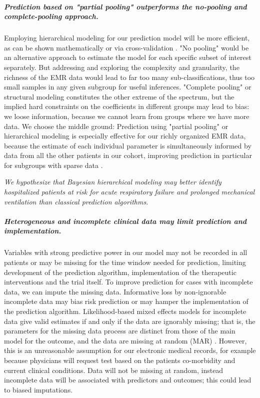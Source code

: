 \documentclass[11pt,notitlepage]{article}
\begin{document}
\subparagraph*{Prediction based on "partial pooling" outperforms the no-pooling and complete-pooling approach.}
Employing hierarchical modeling for our prediction model will be more efficient, as can be shown mathematically or via cross-validation \cite{Gelman-Hill_2014}. "No pooling" would be an alternative approach to estimate the model for each specific subset of interest separately. But addressing and exploring the complexity and granularity, the richness of the EMR data would lead to far too many sub-classifications, thus too small samples in any given subgroup for useful inferences. "Complete pooling" or structural modeling constitutes the other extreme of the spectrum, but the implied hard constraints on the coefficients in different groups may lead to bias: we loose information, because we cannot learn from groups where we have more data. We choose the middle ground: Prediction using "partial pooling" or hierarchical modeling is especially effective for our richly organized EMR data, because the estimate of each individual parameter is simultaneously informed by data from all the other patients in our cohort, improving prediction in particular for subgroups with sparse data \cite{Gelman_multilevel_2006}. \newline

\emph{We hypothesize that Bayesian hierarchical modeling may better identify hospitalized patients at risk for acute respiratory failure and prolonged mechanical ventilation than classical prediction algorithms.}


\subparagraph*{Heterogeneous and incomplete clinical data may limit prediction and implementation.}
Variables with strong predictive power in our model may not be recorded in all patients or may be missing for the time window needed for prediction, limiting development of the prediction algorithm, implementation of the therapeutic interventions and the trial itself. To improve prediction for cases with incomplete data, we can impute the missing data. Informative loss by non-ignorable incomplete data may bias risk prediction or may hamper the implementation of the prediction algorithm. Likelihood-based mixed effects models for incomplete data give valid estimates if and only if the data are ignorably missing; that is, the parameters for the missing data process are distinct from those of the main model for the outcome, and the data are missing at random (MAR) \cite{Rubin_1976}. However, this is an unreasonable assumption for our electronic medical records, for example because physicians will request test based on the patients co-morbidity and current clinical conditions. Data will not be missing at random, instead incomplete data will be associated with predictors and outcomes; this could lead to biased imputations.
\end{document}

